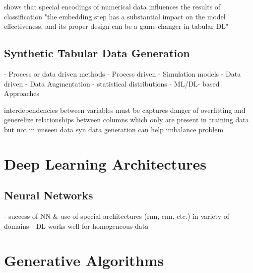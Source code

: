 \cite{gorishniy2022EmbeddingsNumericalFeatures} shows that special encodings of numerical data influences the results of classification %
"the embedding step has a substantial impact on the model effectiveness, and its proper design can be a game-changer in tabular DL"

\subsection{Synthetic Tabular Data Generation}

- Process or data driven methods \cite{goncalves2020GenerationEvaluationSynthetic}
    - Process driven
        - Simulation models \cite{kowalczyk2022TaxonomyUseSynthetic}
    - Data driven
        - Data Augmentation \cite{kowalczyk2022TaxonomyUseSynthetic}
        - statistical distributions \cite{kowalczyk2022TaxonomyUseSynthetic}
        - ML/DL- based Approaches \cite{kowalczyk2022TaxonomyUseSynthetic}

interdependencies between variables must be captures \cite{lederrey2022DATGANIntegratingExperta}
danger of overfitting and generelize relationships between columns which only are present in training data but not in unseen data \cite{lederrey2022DATGANIntegratingExperta}
syn data generation can help imbalance problem \cite{borisov2022DeepNeuralNetworks}


\section{Deep Learning Architectures}
\label{ch:preliminaries-deepLearningArchitectures}

\subsection{Neural Networks}
\label{ch:preliminaries-deepLearningArchitectures-neuralNetworks}

- success of NN \& use of special architectures (rnn, cnn, etc.) in variety of domains \cite{borisov2022DeepNeuralNetworks}
- DL works well for homogeneous data \cite{borisov2022DeepNeuralNetworks}

\section{Generative Algorithms}
\label{ch:preliminaries-generativeAlgorithms}

